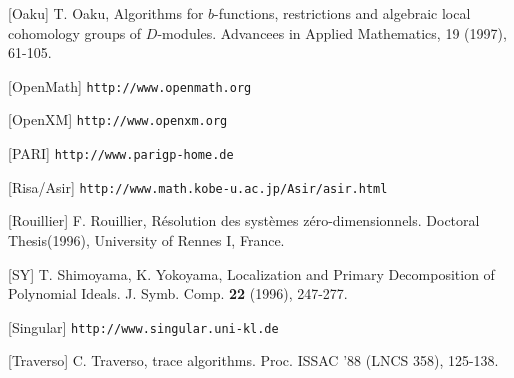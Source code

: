 \begin{slide}{}

[Oaku] T. Oaku, Algorithms for $b$-functions, restrictions and algebraic
local cohomology groups of $D$-modules.
Advancees in Applied Mathematics, 19 (1997), 61-105.

[OpenMath] {\tt http://www.openmath.org}

[OpenXM] {\tt http://www.openxm.org}

[PARI] {\tt http://www.parigp-home.de}

[Risa/Asir] {\tt http://www.math.kobe-u.ac.jp/Asir/asir.html}

[Rouillier] F. Rouillier,
R\'esolution des syst\`emes z\'ero-dimensionnels. 
Doctoral Thesis(1996), University of Rennes I, France.

[SY] T. Shimoyama, K. Yokoyama, Localization and Primary Decomposition of Polynomial Ideals.  J. Symb. Comp. {\bf 22} (1996), 247-277.

[Singular] {\tt http://www.singular.uni-kl.de}

[Traverso] C. Traverso, \gr trace algorithms. Proc. ISSAC '88 (LNCS 358), 125-138.

\end{slide}
